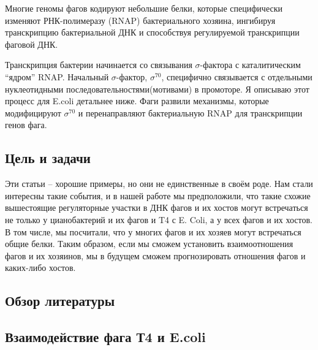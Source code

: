 \documentclass[14pt]{extarticle}
\begin{document}
    \par{Многие геномы фагов кодируют небольшие белки, которые специфически изменяют РНК-полимеразу (RNAP)
    бактериального хозяина, ингибируя транскрипцию бактериальной ДНК и способствуя регулируемой транскрипции фаговой 
    ДНК. \cite{phagetrans}}    
    
    \par{Транскрипция бактерии начинается со связывания $\sigma$-фактора с каталитическим ``ядром'' RNAP. Начальный 
    $\sigma$-фактор, $\sigma^{70}$, специфично связывается с отдельными нуклеотидными последовательностями(мотивами) в 
    промоторе. Я описываю этот процесс для E.coli детальнее ниже. Фаги развили механизмы, которые модифицируют 
    $\sigma^{70}$ и перенаправляют бактериальную RNAP для транскрипции генов фага.}
    
\newpage
\begin{center}
\item \section{Цель и задачи} \label{sec:code}
\end{center}

\par{Эти статьи – хорошие примеры, но они не единственные в своём роде. Нам стали интересны такие события, и в нашей
    работе мы предположили, что такие схожие вышестоящие регуляторные участки в ДНК фагов и их хостов могут встречаться
    не только у цианобактерий и их фагов и T4 с E. Coli, а у всех фагов и их хостов. В том числе, мы посчитали, что у
    многих фагов и их хозяев могут встречаться общие белки. Таким образом, если мы сможем установить взаимоотношения
    фагов и их хозяинов, мы в будущем сможем прогнозировать отношения фагов и каких-либо хостов.}

\newpage
\begin{center}
\item \section{Обзор литературы} \label{sec:math}
\item \subsection{Взаимодействие фага Т4 и E.coli}
\end{center}
        
\end{document}

